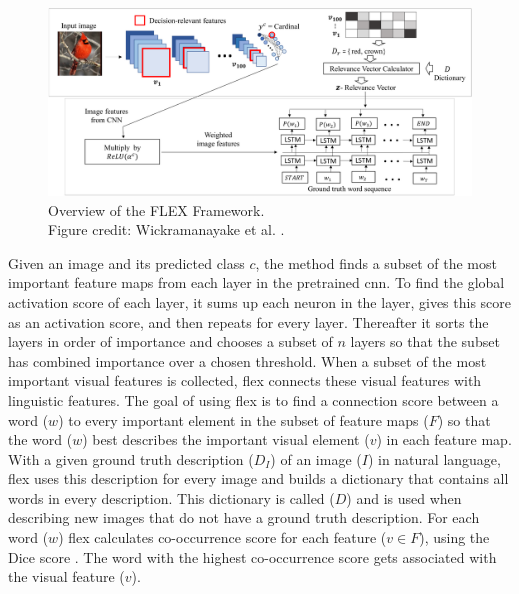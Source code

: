         \begin{figure}[htb]
            \centering
            \centerline{
            \includegraphics[width=17cm]{images/FLEX_overview.png}}
            \caption{Overview of the FLEX Framework.\\
            Figure credit: Wickramanayake et al. \cite{wickramanayakeFLEXFaithfulLinguistic2019}.}
            \label{fig:flex_overview}
        \end{figure}

        Given an image and its predicted class $c$, the method finds a subset of the most important feature maps from each layer in the pretrained \gls{cnn}. To find the global activation score of each layer, it sums up each neuron in the layer, gives this score as an activation score, and then repeats for every layer. Thereafter it sorts the layers in order of importance and chooses a subset of $n$ layers so that the subset has combined importance over a chosen threshold. When a subset of the most important visual features is collected, \gls{flex} connects these visual features with linguistic features. The goal of using \gls{flex} is to find a connection score between a word ($w$) to every important element in the subset of feature maps ($F$) so that the word ($w$) best describes the important visual element ($v$) in each feature map. With a given ground truth description ($D_I$) of an image ($I$) in natural language, \gls{flex} uses this description for every image and builds a dictionary that contains all words in every description. This dictionary is called ($D$) and is used when describing new images that do not have a ground truth description. For each word ($w$) \gls{flex} calculates co-occurrence score for each feature ($v \in F$), using the Dice score \cite{diceMeasuresAmountEcologic1945, sorensenMethodEstablishingGroups1948}. The word with the highest co-occurrence score gets associated with the visual feature ($v$). 



